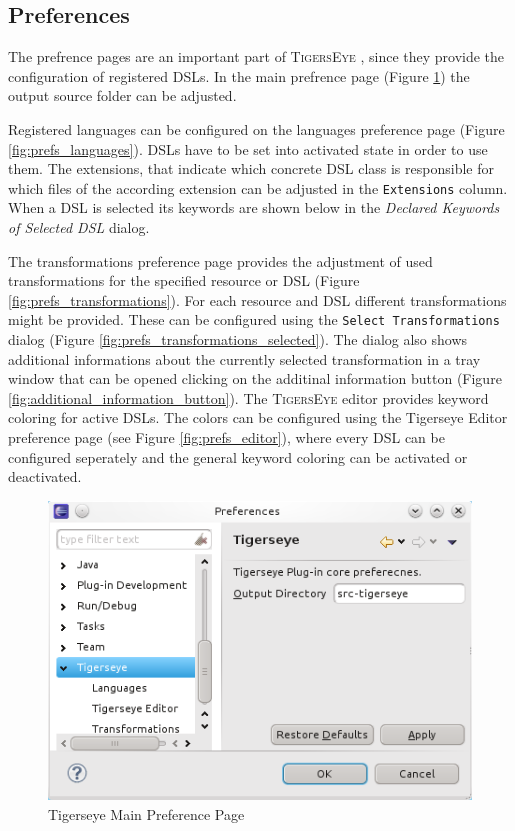 \documentclass[article,colorback,accentcolor=tud4c]{tudreport}
\newcommand\tiger{%
  \textsc{TigersEye}
}
\begin{document}
	\subsection{Preferences}
	The prefrence pages are an important part of \tiger, since they provide the configuration of registered DSLs. In the main prefrence page (Figure \ref{fig:prefs_main}) the output source folder can be adjusted.
	
	Registered languages can be configured on the languages preference page (Figure \ref{fig:prefs_languages}). DSLs have to be set into activated state in order to use them.	
	The extensions, that indicate which concrete DSL class is responsible for which files of the according extension can be adjusted in the \texttt{Extensions} column. When a DSL is selected its keywords are shown below in the \textit{Declared Keywords of Selected DSL} dialog.
	
	The transformations preference page provides the adjustment of used transformations for the specified resource or DSL (Figure \ref{fig:prefs_transformations}). For each resource and DSL different transformations might be provided. These can be configured using the \texttt{Select Transformations} dialog (Figure \ref{fig:prefs_transformations_selected}). The dialog also shows additional informations about the currently selected transformation in a tray window that can be opened clicking on the additinal information button (Figure \ref{fig:additional_information_button}). The \tiger editor provides keyword coloring for active DSLs. The colors can be configured using the Tigerseye Editor preference page (see Figure \ref{fig:prefs_editor}), where every DSL can be configured seperately and the general keyword coloring can be activated or deactivated.
	
	\begin{figure}
	  \centering
	  \includegraphics[scale=.5,keepaspectratio=true]{./pics/preferences_main.png}
	  \caption{Tigerseye Main Preference Page}
	  \label{fig:prefs_main}
	\end{figure}
\end{document}
